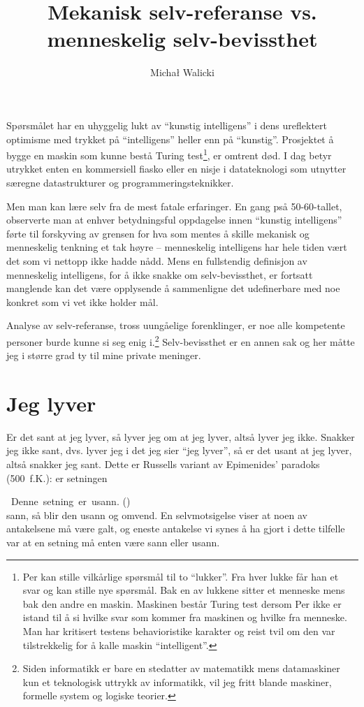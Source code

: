 \documentclass[10pt,twocolumn]{article}
\title{Mekanisk selv-referanse vs. menneskelig selv-bevissthet}
\author{Micha{\l} Walicki}
\date{{}}
\newcounter{EQ}
\newcommand{\equ}[1]{\refstepcounter{EQ}\vspace{.5ex}\par\noindent\ 
    \hfill #1\hfill{(\theEQ)}\\[.5ex]}
\newcommand{\<}{\langle}
\renewcommand{\>}{\rangle}
\begin{document}
\maketitle
Sp{\o}rsm{\aa}let har en uhyggelig lukt av ``kunstig intelligens'' i dens 
ureflektert optimisme med trykket p{\aa} ``intelligens'' heller enn 
p{\aa} ``kunstig''. 
Prosjektet {\aa} bygge en maskin 
som kunne best{\aa} Turing test\footnote{Per kan stille 
vilk{\aa}rlige sp{\o}rsm{\aa}l til to ``lukker''. Fra 
hver lukke f{\aa}r han et svar og kan stille nye sp{\o}rsm{\aa}l. Bak en av
lukkene sitter et menneske mens bak den andre en maskin. Maskinen 
best{\aa}r Turing test dersom Per ikke er istand til {\aa} si hvilke svar 
som kommer fra maskinen og hvilke fra menneske. 
Man har kritisert testens behavioristike karakter og reist tvil om 
den var tilstrekkelig for {\aa} kalle maskin ``intelligent''.}, 
er omtrent d{\o}d.
I dag betyr utrykket enten en kommersiell fiasko eller en 
nisje i datateknologi som utnytter s{\ae}regne datastrukturer og
programmeringsteknikker.

Men man kan l{\ae}re selv fra de mest fatale erfaringer.
En gang ps{\aa} 50-60-tallet,
observerte man at enhver betydningsful oppdagelse innen ``kunstig intelligens'' 
f{\o}rte til forskyving av grensen for hva som 
mentes {\aa} skille mekanisk og menneskelig tenkning et tak h{\o}yre -- 
menneskelig intelligens har hele tiden v{\ae}rt det som vi nettopp ikke hadde 
n{\aa}dd. 
 Mens en fullstendig definisjon 
av menneskelig intelligens, for {\aa} ikke snakke om selv-bevissthet, er 
fortsatt manglende
kan det v{\ae}re opplysende {\aa} sammenligne det udefinerbare med noe 
konkret som vi vet ikke holder m{\aa}l. 

Analyse av selv-referanse, tross 
uung{\aa}elige forenklinger, er noe alle kompetente personer burde
kunne si seg enig 
i.\footnote{Siden informatikk er bare en stedatter av matematikk mens 
datamaskiner
kun et teknologisk uttrykk av informatikk, vil jeg fritt blande maskiner,
formelle system og logiske teorier.}
Selv-bevissthet er en annen sak og her 
m{\aa}tte jeg i st{\o}rre grad ty til mine private meninger.


\section{Jeg lyver}
Er det 
sant at jeg lyver, s{\aa} lyver jeg om at jeg lyver, alts{\aa} lyver jeg ikke. 
Snakker jeg ikke sant, dvs. lyver jeg i det jeg sier ``jeg 
lyver'', s{\aa} er det usant at jeg lyver, alts{\aa} snakker jeg 
sant. 
Dette er Russells variant av Epimenides' paradoks (500~f.K.): er setningen
\equ{Denne\ setning\ er\ usann.
}\label{pa:b}
sann, s{\aa} blir den usann og omvend.
En selvmotsigelse viser at noen av antakelsene m{\aa} v{\ae}re galt, og 
eneste antakelse vi synes {\aa} ha gjort i dette tilfelle var at en 
setning m{\aa} enten v{\ae}re sann eller usann. 
\end{document}
